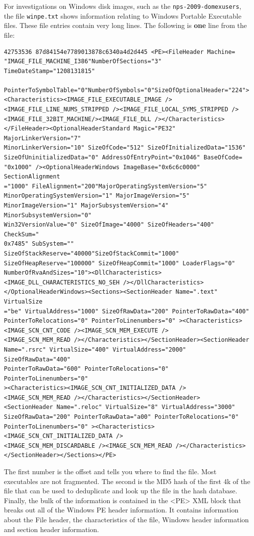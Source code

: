 For investigations on Windows disk images, such as the \texttt{nps-2009-domexusers}, the file \texttt{winpe.txt} shows information relating to Windows Portable Executable files.  These file entries contain very long lines. The following is \textbf{one} line from the file:
\lstset{style=customfile}
\begin{lstlisting}
42753536 87d84154e7789013878c6340a4d2d445 <PE><FileHeader Machine=
"IMAGE_FILE_MACHINE_I386"NumberOfSections="3" TimeDateStamp="1208131815"
 PointerToSymbolTable="0"NumberOfSymbols="0"SizeOfOptionalHeader="224">
<Characteristics><IMAGE_FILE_EXECUTABLE_IMAGE />
<IMAGE_FILE_LINE_NUMS_STRIPPED /><IMAGE_FILE_LOCAL_SYMS_STRIPPED />
<IMAGE_FILE_32BIT_MACHINE/><IMAGE_FILE_DLL /></Characteristics>
</FileHeader><OptionalHeaderStandard Magic="PE32" MajorLinkerVersion="7"
MinorLinkerVersion="10" SizeOfCode="512" SizeOfInitializedData="1536"
SizeOfUninitializedData="0" AddressOfEntryPoint="0x1046" BaseOfCode=
"0x1000" /><OptionalHeaderWindows ImageBase="0x6c6c0000" SectionAlignment
="1000" FileAlignment="200"MajorOperatingSystemVersion="5"
MinorOperatingSystemVersion="1" MajorImageVersion="5"
MinorImageVersion="1" MajorSubsystemVersion="4" MinorSubsystemVersion="0"
Win32VersionValue="0" SizeOfImage="4000" SizeOfHeaders="400" CheckSum="
0x7485" SubSystem="" SizeOfStackReserve="40000"SizeOfStackCommit="1000"
SizeOfHeapReserve="100000" SizeOfHeapCommit="1000" LoaderFlags="0"
NumberOfRvaAndSizes="10"><DllCharacteristics>
<IMAGE_DLL_CHARACTERISTICS_NO_SEH /></DllCharacteristics>
</OptionalHeaderWindows><Sections><SectionHeader Name=".text" VirtualSize
="be" VirtualAddress="1000" SizeOfRawData="200" PointerToRawData="400"
PointerToRelocations="0" PointerToLinenumbers="0" ><Characteristics>
<IMAGE_SCN_CNT_CODE /><IMAGE_SCN_MEM_EXECUTE />
<IMAGE_SCN_MEM_READ /></Characteristics></SectionHeader><SectionHeader
Name=".rsrc" VirtualSize="400" VirtualAddress="2000" SizeOfRawData="400"
PointerToRawData="600" PointerToRelocations="0" PointerToLinenumbers="0"
><Characteristics><IMAGE_SCN_CNT_INITIALIZED_DATA />
<IMAGE_SCN_MEM_READ /></Characteristics></SectionHeader>
<SectionHeader Name=".reloc" VirtualSize="8" VirtualAddress="3000"
SizeOfRawData="200" PointerToRawData="a00" PointerToRelocations="0"
PointerToLinenumbers="0" ><Characteristics><IMAGE_SCN_CNT_INITIALIZED_DATA />
<IMAGE_SCN_MEM_DISCARDABLE /><IMAGE_SCN_MEM_READ /></Characteristics>
</SectionHeader></Sections></PE>
\end{lstlisting}
The first number is the offset and tells you where to find the file. Most executables are not fragmented. The second is the MD5 hash of the first 4k of the file that can be used to deduplicate and look up the file in the hash database. Finally, the bulk of the information is contained in the <PE> XML block that breaks out all of the Windows PE header information. It contains information about the File header, the characteristics of the file, Windows header information and section header information.\\

